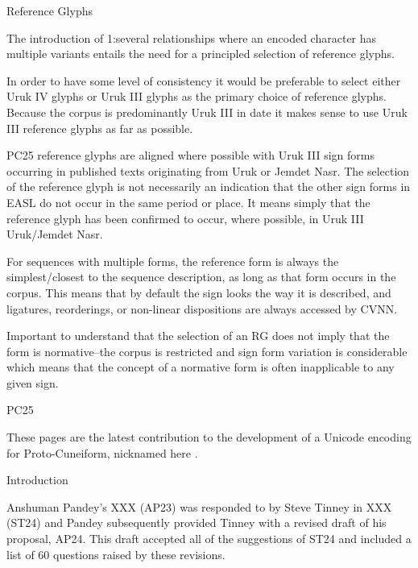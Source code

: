 \Hendul
\Hhhh{}Reference Glyphs


\par The introduction of 1:several relationships where an
      encoded character has multiple variants entails the need for a
      principled selection of reference glyphs.


\par In order to have some level of consistency it would be
      preferable to select either Uruk IV glyphs or Uruk III glyphs
      as the primary choice of reference glyphs.  Because the corpus
      is predominantly Uruk III in date it makes sense to use Uruk
      III reference glyphs as far as possible.


\par PC25 reference glyphs are aligned where possible with Uruk
      III sign forms occurring in published texts originating from
      Uruk or Jemdet Nasr. The selection of the reference glyph is not
      necessarily an indication that the other sign forms in EASL do
      not occur in the same period or place.  It means simply that the
      reference glyph has been confirmed to occur, where possible, in
      Uruk III Uruk/Jemdet Nasr.


\par For sequences with multiple forms, the reference form is
      always the simplest/closest to the sequence description, as long
      as that form occurs in the corpus.  This means that by default
      the sign looks the way it is described, and ligatures,
      reorderings, or non-linear dispositions are always accessed by
      CVNN.


\par Important to understand that the selection of an RG does not
      imply that the form is normative--the corpus is restricted and
      sign form variation is considerable which means that the concept
      of a normative form is often inapplicable to any given sign.

\Hh{}PC25


\par These pages are the latest contribution to the development of
      a Unicode encoding for Proto-Cuneiform, nicknamed here
      .

\Hh{}Introduction


\par Anshuman Pandey's XXX (AP23) was responded to by Steve Tinney
      in XXX (ST24) and Pandey subsequently provided Tinney with a
      revised draft of his proposal, AP24. This draft accepted all of
      the suggestions of ST24 and included a list of 60 questions
      raised by these revisions.


